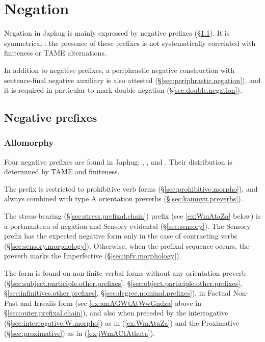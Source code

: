 \chapter{Negation} \label{chap:negation}
Negation in Japhug is mainly expressed by negative prefixes (§\ref{sec:negation}). It is symmetrical \citep{miestamo05negation}: the presence of these prefixes is not systematically correlated with finiteness or TAME alternations.

In addition to negative prefixes, a periphrastic negative construction with sen\-tence-final negative auxiliary is also attested (§\ref{sec:periphrastic.negation}), and it is required in particular to mark double negation (§\ref{sec:double.negation}).




\section{Negative prefixes} \label{sec:negation}

\subsection{Allomorphy} \label{sec:neg.allomorphs}
Four negative prefixes are found in Japhug: , ,  and . Their distribution is determined by TAME and finiteness.

The  prefix is restricted to prohibitive verb forms (§\ref{sec:prohibitive.morpho}), and always combined with type A orientation preverbs (§\ref{sec:kamnyu.preverbs}). 

The stress-bearing (§\ref{sec:stress.prefixal.chain})  prefix (see \ref{ex:WmAtaZa} below) is a portmanteau of negation and Sensory evidental (§\ref{sec:sensory}). The Sensory prefix  has the expected negative form  only in the case of contracting verbs (§\ref{sec:sensory.morphology}). Otherwise, when the  prefixal sequence  occurs, the  preverb marks the Imperfective (§\ref{sec:ipfv.morphology}).

The form  is found on non-finite verbal forms without any orientation preverb (§\ref{sec:subject.participle.other.prefixes}, §\ref{sec:object.participle.other.prefixes}, §\ref{sec:infinitives.other.prefixes}, §\ref{sec:degree.nominal.prefixes}), in Factual Non-Past and Irrealis form (see \ref{ex:amAGWtAtWwGndza} above in §\ref{sec:outer.prefixal.chain}), and also when preceded by the interrogative  (§\ref{sec:interrogative.W.morpho}) as in (\ref{ex:WmAtaZa}) and the Proximative  (§\ref{sec:proximative}) as in  (\ref{ex:jWmACtAthuta}).


